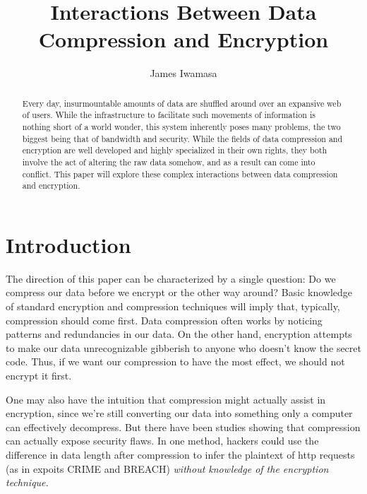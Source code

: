 \documentclass[11pt]{article}
\begin{document}
\title{Interactions Between Data Compression and Encryption}
\author{James Iwamasa}
\maketitle

\begin{abstract}
Every day, insurmountable amounts of data are shuffled around over an expansive web of users. 
While the infrastructure to facilitate such movements of information is nothing short of a world wonder, 
this system inherently poses many problems, the two biggest being that of bandwidth and security. 
While the fields of data compression and encryption are well developed and highly specialized in their 
own rights, they both involve the act of altering the raw data somehow, and as a result can come into 
conflict. This paper will explore these complex interactions between data compression and encryption.
\end{abstract}


\section{Introduction}\label{intro-sect}
The direction of this paper can be characterized by a single question: Do we compress our data before we 
encrypt or the other way around? Basic knowledge of standard encryption and compression techniques will 
imply that, typically, compression should come first. Data compression often works by noticing patterns and 
redundancies in our data. On the other hand, encryption attempts to make our data unrecognizable gibberish 
to anyone who doesn't know the secret code. Thus, if we want our compression to have the most effect, 
we should not encrypt it first.

One may also have the intuition that compression might actually assist in encryption, 
since we're still converting our data into something only a computer can effectively decompress. 
But there have been studies\cite{kelsey, gluck} showing that compression can actually expose security flaws. 
In one method, hackers could use the difference in data length after compression to infer 
the plaintext of http requests (as in expoits CRIME and BREACH) \emph{without knowledge of the encryption technique.}
\end{document}
